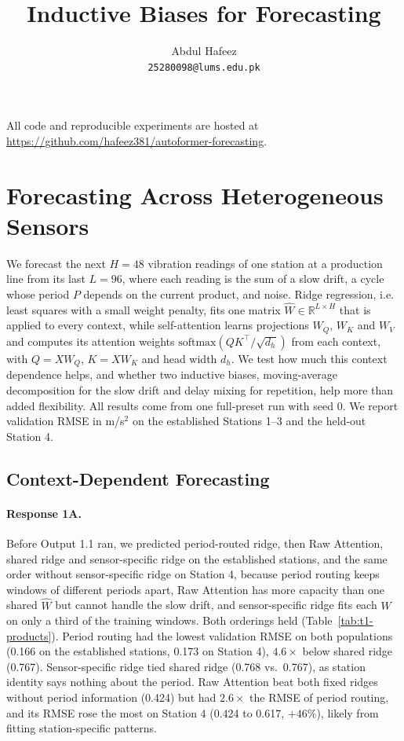 \documentclass{article}
\title{Inductive Biases for Forecasting}
\author{%
  Abdul Hafeez \\
  \texttt{25280098@lums.edu.pk}
}
\begin{document}
\maketitle

All code and reproducible experiments are hosted at \url{https://github.com/hafeez381/autoformer-forecasting}.

\section{Forecasting Across Heterogeneous Sensors}
\label{sec:t1}
\label{subsec:t1-setup}

We forecast the next $H = 48$ vibration readings of one station at a production line from its last $L = 96$, where each reading is the sum of a slow drift, a cycle whose period $P$ depends on the current product, and noise. Ridge regression, i.e. least squares with a small weight penalty, fits one matrix $\hat W \in \mathbb{R}^{L \times H}$ that is applied to every context, while self-attention learns projections $W_Q$, $W_K$ and $W_V$ and computes its attention weights $\mathrm{softmax}(QK^\top/\sqrt{d_h})$ from each context, with $Q = XW_Q$, $K = XW_K$ and head width $d_h$. We test how much this context dependence helps, and whether two inductive biases, moving-average decomposition for the slow drift and delay mixing for repetition, help more than added flexibility. All results come from one full-preset run with seed 0. We report validation RMSE in m/s$^2$ on the established Stations 1--3 and the held-out Station 4.

\subsection{Context-Dependent Forecasting}
\label{subsec:t1-context}

\paragraph{Response 1A.}

Before Output 1.1 ran, we predicted period-routed ridge, then Raw Attention, shared ridge and sensor-specific ridge on the established stations, and the same order without sensor-specific ridge on Station 4, because period routing keeps windows of different periods apart, Raw Attention has more capacity than one shared $\hat W$ but cannot handle the slow drift, and sensor-specific ridge fits each $\hat W$ on only a third of the training windows. Both orderings held (Table~\ref{tab:t1-products}). Period routing had the lowest validation RMSE on both populations (0.166 on the established stations, 0.173 on Station 4), $4.6\times$ below shared ridge (0.767). Sensor-specific ridge tied shared ridge (0.768 vs.\ 0.767), as station identity says nothing about the period. Raw Attention beat both fixed ridges without period information (0.424) but had $2.6\times$ the RMSE of period routing, and its RMSE rose the most on Station 4 (0.424 to 0.617, $+46\%$), likely from fitting station-specific patterns.
\end{document}
